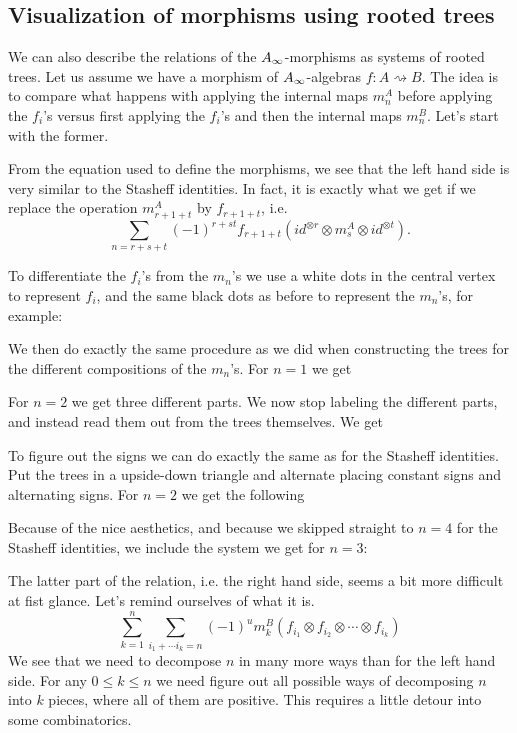 


\subsection{Visualization of morphisms using rooted trees}
\label{ssec:trees2}

We can also describe the relations of the $A_{\infty}$-morphisms as systems of rooted trees. Let us assume we have a morphism of $A_{\infty}$-algebras $f\colon A\rightsquigarrow B$. The idea is to compare what happens with applying the internal maps $m_n^A$ before applying the $f_i$'s versus first applying the $f_i$'s and then the internal maps $m_n^B$. Let's start with the former.

From the equation used to define the morphisms, we see that the left hand side is very similar to the Stasheff identities. In fact, it is exactly what we get if we replace the operation $m_{r+1+t}^A$ by $f_{r+1+t}$, i.e. 
\begin{equation*}
    \sum_{n = r+s+t}(-1)^{r+st}f_{r+1+t}(id^{\otimes r}\otimes m_s^A \otimes id^{\otimes t}).
\end{equation*}

To differentiate the $f_i$'s from the $m_n$'s we use a white dots in the central vertex to represent $f_i$, and the same black dots as before to represent the $m_n$'s, for example:


We then do exactly the same procedure as we did when constructing the trees for the different compositions of the $m_n$'s. For $n=1$ we get 


For $n=2$ we get three different parts. We now stop labeling the different parts, and instead read them out from the trees themselves. We get


To figure out the signs we can do exactly the same as for the Stasheff identities. Put the trees in a upside-down triangle and alternate placing constant signs and alternating signs. For $n=2$ we get the following


Because of the nice aesthetics, and because we skipped straight to $n=4$ for the Stasheff identities, we include the system we get for $n=3$:



The latter part of the relation, i.e. the right hand side, seems a bit more difficult at fist glance. Let's remind ourselves of what it is.
\begin{equation*}
     \sum_{k=1}^{n}\sum_{i_1+\cdots i_k = n}(-1)^{u} m_k^B(f_{i_1}\otimes f_{i_2}\otimes \cdots \otimes f_{i_k})
\end{equation*}
We see that we need to decompose $n$ in many more ways than for the left hand side. For any $0\leq k\leq n$ we need figure out all possible ways of decomposing $n$ into $k$ pieces, where all of them are positive. This requires a little detour into some combinatorics.

